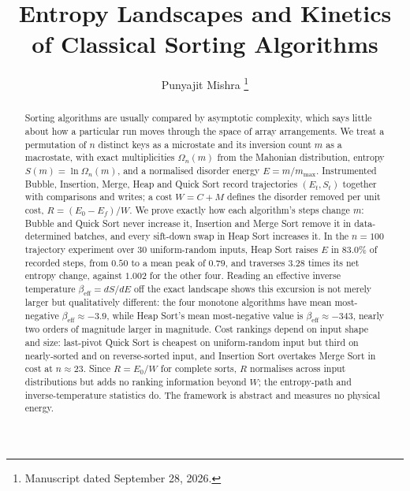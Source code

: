\documentclass[10pt,journal]{IEEEtran}
\newcommand{\mmax}{m_{\max}}
\begin{document}
\title{Entropy Landscapes and Kinetics of Classical Sorting Algorithms}
\author{Punyajit Mishra%
\thanks{Manuscript dated September 28, 2026.}}
\maketitle

\begin{abstract}
Sorting algorithms are usually compared by asymptotic complexity, which says little about how a particular run moves through the space of array arrangements. We treat a permutation of $n$ distinct keys as a microstate and its inversion count $m$ as a macrostate, with exact multiplicities $\Omega_n(m)$ from the Mahonian distribution, entropy $S(m)=\ln\Omega_n(m)$, and a normalised disorder energy $E=m/\mmax$. Instrumented Bubble, Insertion, Merge, Heap and Quick Sort record trajectories $(E_t,S_t)$ together with comparisons and writes; a cost $W=C+M$ defines the disorder removed per unit cost, $R=(E_0-E_f)/W$. We prove exactly how each algorithm's steps change $m$: Bubble and Quick Sort never increase it, Insertion and Merge Sort remove it in data-determined batches, and every sift-down swap in Heap Sort increases it. In the $n=100$ trajectory experiment over 30 uniform-random inputs, Heap Sort raises $E$ in 83.0\% of recorded steps, from $0.50$ to a mean peak of $0.79$, and traverses $3.28$ times its net entropy change, against $1.002$ for the other four. Reading an effective inverse temperature $\beta_{\mathrm{eff}}=dS/dE$ off the exact landscape shows this excursion is not merely larger but qualitatively different: the four monotone algorithms have mean most-negative $\beta_{\mathrm{eff}}\approx-3.9$, while Heap Sort's mean most-negative value is $\beta_{\mathrm{eff}}\approx-343$, nearly two orders of magnitude larger in magnitude. Cost rankings depend on input shape and size: last-pivot Quick Sort is cheapest on uniform-random input but third on nearly-sorted and on reverse-sorted input, and Insertion Sort overtakes Merge Sort in cost at $n\approx 23$. Since $R=E_0/W$ for complete sorts, $R$ normalises across input distributions but adds no ranking information beyond $W$; the entropy-path and inverse-temperature statistics do. The framework is abstract and measures no physical energy.
\end{abstract}
\end{document}
